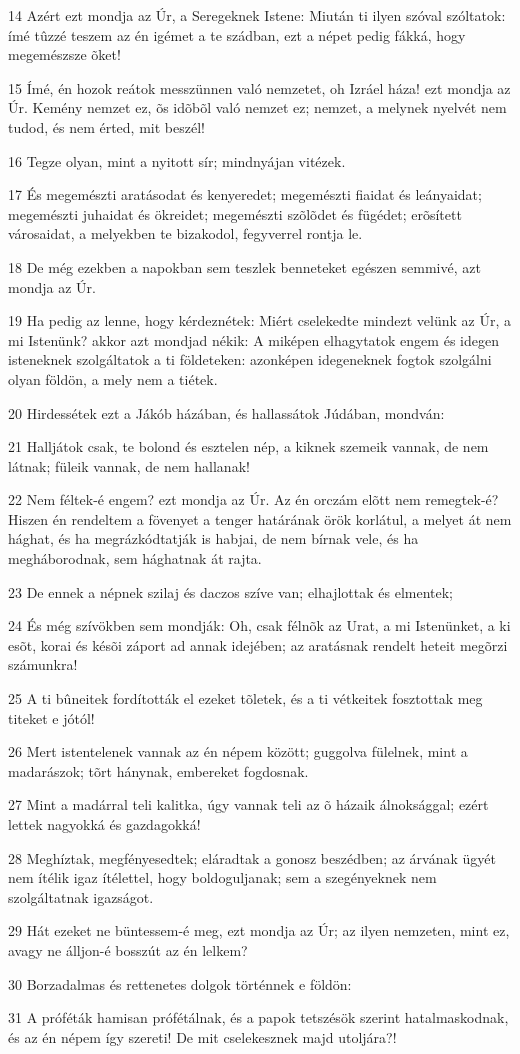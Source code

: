 \par 14 Azért ezt mondja az Úr, a Seregeknek Istene: Miután ti ilyen szóval szóltatok: ímé tûzzé teszem az én igémet a te szádban, ezt a népet pedig fákká, hogy megemészsze õket!
\par 15 Ímé, én hozok reátok messzünnen való nemzetet, oh Izráel háza! ezt mondja az Úr. Kemény nemzet ez, õs idõbõl való nemzet ez; nemzet, a melynek nyelvét  nem tudod, és nem érted, mit beszél!
\par 16 Tegze olyan, mint a nyitott sír; mindnyájan vitézek.
\par 17 És megemészti aratásodat és kenyeredet; megemészti fiaidat és leányaidat; megemészti juhaidat és ökreidet; megemészti szõlõdet és fügédet; erõsített városaidat, a melyekben te bizakodol, fegyverrel rontja le.
\par 18 De még ezekben a napokban sem teszlek benneteket egészen semmivé, azt mondja az Úr.
\par 19 Ha pedig az lenne, hogy kérdeznétek: Miért cselekedte mindezt velünk az Úr, a mi Istenünk? akkor azt mondjad nékik: A miképen elhagytatok engem és idegen isteneknek szolgáltatok a ti földeteken: azonképen  idegeneknek fogtok szolgálni olyan földön, a mely nem a tiétek.
\par 20 Hirdessétek ezt a Jákób házában, és hallassátok Júdában, mondván:
\par 21 Halljátok csak, te bolond és esztelen nép, a kiknek  szemeik vannak, de nem látnak; füleik vannak, de nem hallanak!
\par 22 Nem féltek-é engem? ezt mondja az Úr. Az én orczám elõtt nem remegtek-é? Hiszen én rendeltem a fövenyet a tenger határának örök korlátul, a melyet át nem hághat, és ha megrázkódtatják is habjai, de nem bírnak vele, és ha megháborodnak, sem hághatnak át rajta.
\par 23 De ennek a népnek szilaj és daczos szíve van; elhajlottak és elmentek;
\par 24 És még szívökben sem mondják: Oh, csak félnõk az Urat, a mi Istenünket, a ki esõt, korai és késõi záport ad annak idejében; az aratásnak rendelt heteit megõrzi számunkra!
\par 25 A ti bûneitek fordították el ezeket tõletek, és a ti vétkeitek fosztottak meg titeket e jótól!
\par 26 Mert istentelenek vannak az én népem között; guggolva fülelnek, mint a madarászok; tõrt hánynak, embereket fogdosnak.
\par 27 Mint a madárral teli kalitka, úgy vannak teli az õ házaik álnoksággal; ezért lettek nagyokká és gazdagokká!
\par 28 Meghíztak, megfényesedtek; eláradtak a gonosz beszédben; az árvának ügyét nem ítélik  igaz ítélettel, hogy boldoguljanak; sem a szegényeknek nem szolgáltatnak igazságot.
\par 29 Hát ezeket ne büntessem-é meg, ezt mondja az Úr; az ilyen nemzeten, mint ez, avagy ne álljon-é bosszút az én lelkem?
\par 30 Borzadalmas és rettenetes dolgok történnek e földön:
\par 31 A próféták hamisan prófétálnak, és a papok tetszésök szerint hatalmaskodnak, és az én népem így szereti! De mit cselekesznek majd utoljára?!

